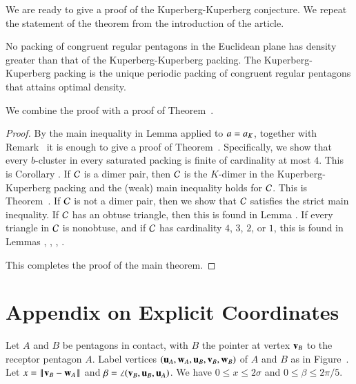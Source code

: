 We are ready to give a proof of the Kuperberg-Kuperberg conjecture. We repeat the statement
of the theorem from the introduction of the article.  

\begin{theorem}   No packing of congruent regular pentagons in the Euclidean
plane has density greater than that of
the Kuperberg-Kuperberg packing.   The Kuperberg-Kuperberg packing is the
unique periodic packing of congruent regular pentagons that attains optimal density.
\end{theorem}

We combine the proof with a proof of Theorem~.

\begin{proof}
By the main inequality in Lemma  applied to $a=a_K$, together with Remark~
it is enough to give a proof of Theorem~.  Specifically, we show that
every $b$-cluster in every saturated packing is finite of cardinality at most $4$.  
This is Corollary .
If $\mathcal C$ is a dimer pair, then $\mathcal C$ is the $K$-dimer in the Kuperberg-Kuperberg packing and the (weak)
main inequality holds for $\mathcal C$.  This is Theorem~.  If $\mathcal C$ is not a dimer pair, then
we show that $\mathcal C$ satisfies the strict main inequality.  If $\mathcal C$ has an obtuse triangle, then this
is found in Lemma .  If every triangle in $\mathcal C$ is nonobtuse, and if $\mathcal C$ has cardinality $4$, $3$,  $2$, or $1$,
this is found in Lemmas , , , .

This completes the proof of the main theorem.
\end{proof}



\section{Appendix on Explicit Coordinates}

Let $A$ and $B$ be pentagons in contact, with $B$ the pointer at
vertex ${\mathbf v}_B$ to the receptor pentagon $A$.  Label vertices
$({\mathbf u}_A,{\mathbf w}_A,{\mathbf u}_B,{\mathbf v}_B,{\mathbf w}_B)$ of $A$ and $B$ as in
Figure~.  Let $x=\norm{\v_B}{\w_A}$ and $\beta =
\angle({\mathbf v}_B,{\mathbf u}_B,{\mathbf u}_A)$.  We have $0\le x\le 2\sigma$ and $0\le
\beta\le 2\pi/5$.



